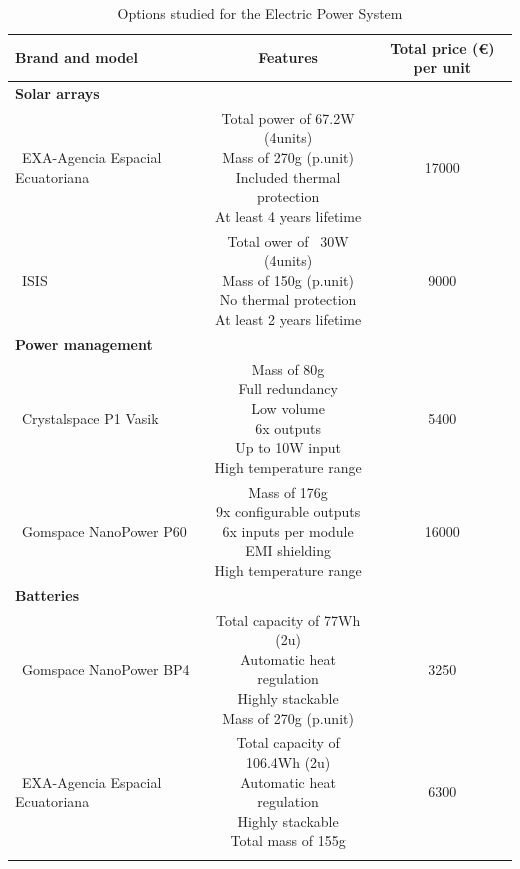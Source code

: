 \begin{longtable}{| l | c | c | }
\hline
\rowcolor[gray]{0.80}	\textbf{Brand and model} &  \textbf{Features}     & \textbf{Total price (\euro) per unit}   \\
\hline
\endfirsthead

\rowcolor[gray]{0.85} \textbf{Solar arrays} &  &  \\
	   ~EXA-Agencia Espacial Ecuatoriana & \makecell{Total power of 67.2W (4units)\\ Mass of 270g (p.unit) \\ Included thermal protection \\At least 4 years lifetime} & 17000 \\
	   \hline
	   ~ISIS & \makecell{Total ower of ~30W (4units) \\ Mass of 150g (p.unit) \\ No thermal protection \\At least 2 years lifetime} & 9000 \\
	   \hline
\rowcolor[gray]{0.85} \textbf{Power management} &  &  \\
	   ~Crystalspace P1 Vasik & \makecell{Mass of 80g \\ Full redundancy \\ Low volume \\ 6x outputs \\ Up to 10W input \\ High temperature range} & 5400 \\
	\hline
	   ~Gomspace NanoPower P60 & \makecell{Mass of 176g \\ 9x configurable outputs \\ 6x inputs per module \\ EMI shielding \\ High temperature range} & 16000 \\
	\hline
\rowcolor[gray]{0.85} \textbf{Batteries} &  &  \\
	   ~Gomspace NanoPower BP4 & \makecell{Total capacity of 77Wh (2u) \\ Automatic heat regulation \\ Highly stackable \\ Mass of 270g (p.unit)} & 3250 \\
	\hline
	~EXA-Agencia Espacial Ecuatoriana & \makecell{Total capacity of 106.4Wh (2u)\\ Automatic heat regulation \\ Highly stackable \\ Total mass of 155g} & 6300 \\
	\hline
	
\caption{Options studied for the Electric Power System}
\label{epsoptions}
\end{longtable}

